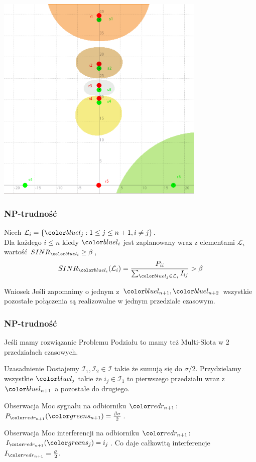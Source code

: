 \documentclass[polish, t,10pt]{beamer}
\begin{document}
\begin{frame}
    \centering
    \includegraphics[width=0.75\textwidth]{pictures/np-placement3.png}
\end{frame}
\begin{frame}
    \frametitle{NP-trudność}
    \begin{lemma}
        Niech $\mathcal{L}_i = \{\lj: 1 \leq j \leq n + 1, i \neq j\}$.\\
        Dla każdego $i \leq n$ kiedy $\li$ jest zaplanowany wraz z elementami $\mathcal{L}_i$ wartość $SINR_\li \ge \beta$,
        $$
            SINR_\li(\mathcal{L}_i) = \frac{P_{ii}}{\sum_{\lj \in \mathcal{L}_i} I_{ij}} > \beta
        $$
    \end{lemma}
    \pause
    \begin{block}{Wniosek}
        Jeśli zapomnimy o jednym z $\lno, \lnt$ wszystkie pozostałe połączenia są realizowalne w jednym przedziale czasowym.
    \end{block}
\end{frame}
\begin{frame}
    \frametitle{NP-trudność}
    Jeśli mamy rozwiązanie Problemu Podziału to mamy też Multi-Slota w 2 przedziałach czasowych.
    \begin{block}{Uzasadnienie}
        Dostajemy $\mathcal{I}_1, \mathcal{I}_2 \in \mathcal{I}$ takie że sumują się do $\sigma/2$. Przydzielamy wszystkie $\lj$ takie że $i_j \in \mathcal{I}_1$ to pierwszego przedziału wraz z $\lno$ a pozostałe do drugiego.
    \end{block}
    \pause
    \begin{block}{Obserwacja}
        Moc sygnału na odbiorniku $\rno$: $P_\rno(\sno) = \frac{\beta\sigma}{2}$.
    \end{block}
    \pause
    \begin{block}{Obserwacja}
        Moc interferencji na odbiorniku $\rno$: $I_\rno(\sj) = i_j$. Co daje całkowitą interferencje $I_\rno = \frac{\sigma}{2}$.
    \end{block}
\end{frame}
\end{document}

